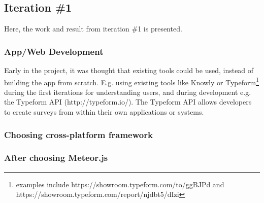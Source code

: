 \subsection{Iteration \#1}
Here, the work and result from iteration \#1 is presented.

\subsubsection{App/Web Development}
Early in the project, it was thought that existing tools could be used, instead of building the app from scratch. E.g. using existing tools like Knowly or Typeform\footnote{examples include https://showroom.typeform.com/to/ggBJPd and https://showroom.typeform.com/report/njdbt5/dIzi} during the first iterations for understanding users, and during development e.g. the Typeform API (http://typeform.io/). The Typeform API allows developers to create surveys from within their own applications or systems.

\subsubsection{Choosing cross-platform framework}

\subsubsection{After choosing Meteor.js}
